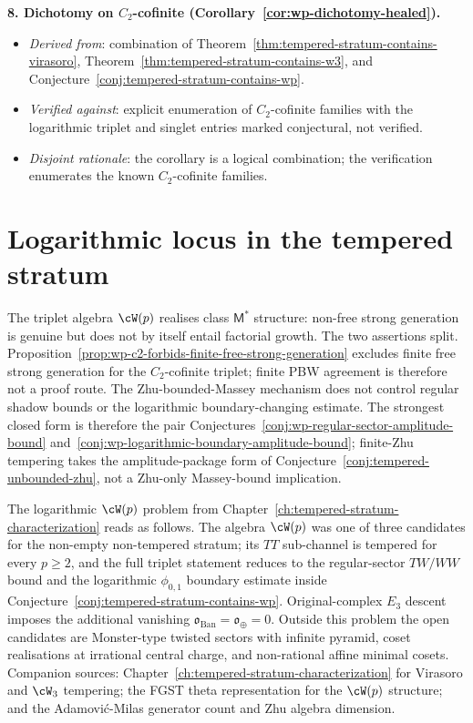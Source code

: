 \textbf{8. Dichotomy on $C_2$-cofinite
(Corollary~\ref{cor:wp-dichotomy-healed}).}
\begin{itemize}[nosep]
\item \emph{Derived from}: combination of
 Theorem~\ref{thm:tempered-stratum-contains-virasoro},
 Theorem~\ref{thm:tempered-stratum-contains-w3}, and
 Conjecture~\ref{conj:tempered-stratum-contains-wp}.
\item \emph{Verified against}: explicit enumeration of
 $C_2$-cofinite families with the logarithmic triplet and singlet
 entries marked conjectural, not verified.
\item \emph{Disjoint rationale}: the corollary is a logical
 combination; the verification enumerates the known
 $C_2$-cofinite families.
\end{itemize}

\section{Logarithmic locus in the tempered stratum}
\label{sec:wp-tempered-stratum-location}

\begin{remark}
\label{rem:wp-triplet-reduction}
The triplet algebra $\cW(p)$ realises class $\mathsf{M}^*$ structure:
non-free strong generation is genuine but does not by itself entail
factorial growth. The two assertions split.
Proposition~\ref{prop:wp-c2-forbids-finite-free-strong-generation}
excludes finite free strong generation for the $C_2$-cofinite triplet;
finite PBW agreement is therefore not a proof route. The
Zhu-bounded-Massey mechanism does not control regular shadow bounds or
the logarithmic boundary-changing estimate. The strongest closed form
is therefore the pair
Conjectures~\ref{conj:wp-regular-sector-amplitude-bound}
and~\ref{conj:wp-logarithmic-boundary-amplitude-bound}; finite-Zhu
tempering takes the amplitude-package form of
Conjecture~\ref{conj:tempered-unbounded-zhu}, not a Zhu-only
Massey-bound implication.
\end{remark}

The logarithmic $\cW(p)$ problem from
Chapter~\ref{ch:tempered-stratum-characterization} reads as follows.
The algebra $\cW(p)$ was one of three candidates for the non-empty
non-tempered stratum; its $TT$ sub-channel is tempered for every
$p \ge 2$, and the full triplet statement reduces to the regular-sector
$TW/WW$ bound and the logarithmic $\phi_{0,1}$ boundary estimate
inside Conjecture~\ref{conj:tempered-stratum-contains-wp}.
Original-complex
$E_3$ descent imposes the additional vanishing
$\mathfrak{o}_{\mathrm{Ban}}=\mathfrak{o}_{\oplus}=0$. Outside this
problem the open candidates are Monster-type twisted sectors with
infinite pyramid, coset realisations at irrational central charge, and
non-rational affine minimal cosets. Companion sources:
Chapter~\ref{ch:tempered-stratum-characterization} for Virasoro and
$\cW_3$ tempering; the FGST theta representation for the $\cW(p)$
structure; and the Adamovi\'c-Milas generator count and Zhu algebra
dimension.

